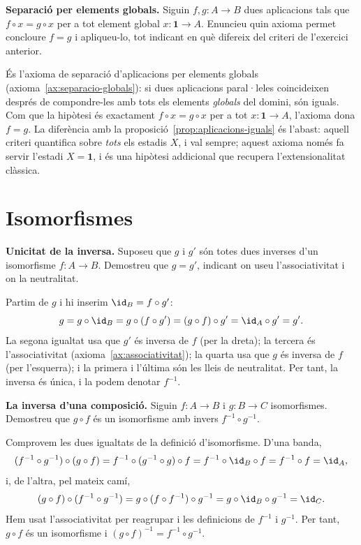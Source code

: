 \begin{exercici}
\textbf{Separació per elements globals.} Siguin \(f,g\colon A\to B\) dues aplicacions tals que \(f\circ x=g\circ x\) per a tot element global \(x\colon\mathbf1\to A\). Enuncieu quin axioma permet concloure \(f=g\) i apliqueu-lo, tot indicant en què difereix del criteri de l'exercici anterior.
\end{exercici}
\begin{solucio}
És l'axioma de separació d'aplicacions per elements globals (axioma~\ref{ax:separacio-globals}): si dues aplicacions paral·leles coincideixen després de compondre-les amb tots els elements \emph{globals} del domini, són iguals. Com que la hipòtesi és exactament \(f\circ x=g\circ x\) per a tot \(x\colon\mathbf1\to A\), l'axioma dona \(f=g\). La diferència amb la proposició~\ref{prop:aplicacions-iguals} és l'abast: aquell criteri quantifica sobre \emph{tots} els estadis \(X\), i val sempre; aquest axioma només fa servir l'estadi \(X=\mathbf1\), i és una hipòtesi addicional que recupera l'extensionalitat clàssica.
\end{solucio}

\section{Isomorfismes}\label{prac:isomorfismes}

\begin{exercici}
\textbf{Unicitat de la inversa.} Suposeu que \(g\) i \(g'\) són totes dues inverses d'un isomorfisme \(f\colon A\to B\). Demostreu que \(g=g'\), indicant on useu l'associativitat i on la neutralitat.
\end{exercici}
\begin{solucio}
Partim de \(g\) i hi inserim \(\id_B=f\circ g'\):
\[
g=g\circ\id_B=g\circ(f\circ g')=(g\circ f)\circ g'=\id_A\circ g'=g'.
\]
La segona igualtat usa que \(g'\) és inversa de \(f\) (per la dreta); la tercera és l'associativitat (axioma~\ref{ax:associativitat}); la quarta usa que \(g\) és inversa de \(f\) (per l'esquerra); i la primera i l'última són les lleis de neutralitat. Per tant, la inversa és única, i la podem denotar \(f^{-1}\).
\end{solucio}

\begin{exercici}
\textbf{La inversa d'una composició.} Siguin \(f\colon A\to B\) i \(g\colon B\to C\) isomorfismes. Demostreu que \(g\circ f\) és un isomorfisme amb invers \(f^{-1}\circ g^{-1}\).
\end{exercici}
\begin{solucio}
Comprovem les dues igualtats de la definició d'isomorfisme. D'una banda,
\[
(f^{-1}\circ g^{-1})\circ(g\circ f)=f^{-1}\circ(g^{-1}\circ g)\circ f=f^{-1}\circ\id_B\circ f=f^{-1}\circ f=\id_A,
\]
i, de l'altra, pel mateix camí,
\[
(g\circ f)\circ(f^{-1}\circ g^{-1})=g\circ(f\circ f^{-1})\circ g^{-1}=g\circ\id_B\circ g^{-1}=\id_C.
\]
Hem usat l'associativitat per reagrupar i les definicions de \(f^{-1}\) i \(g^{-1}\). Per tant, \(g\circ f\) és un isomorfisme i \({(g\circ f)}^{-1}=f^{-1}\circ g^{-1}\).
\end{solucio}

